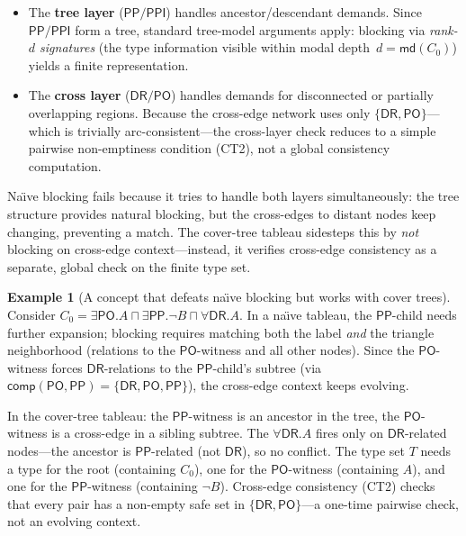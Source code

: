 \documentclass[
]{ceurart}
\theoremstyle{definition}
\newtheorem{examplex}[theorem]{Example}
\newcommand{\DR}{\ensuremath{\mathsf{DR}}}
\newcommand{\PO}{\ensuremath{\mathsf{PO}}}
\newcommand{\PP}{\ensuremath{\mathsf{PP}}}
\newcommand{\PPI}{\ensuremath{\mathsf{PPI}}}
\newcommand{\comp}{\ensuremath{\mathsf{comp}}}
\newcommand{\md}{\ensuremath{\mathsf{md}}}
\begin{document}
\begin{itemize}
  \item The \textbf{tree layer} ($\PP/\PPI$) handles
    ancestor/descendant demands.  Since $\PP/\PPI$ form a tree,
    standard tree-model arguments apply: blocking via
    \emph{rank-$d$ signatures} (the type information visible
    within modal depth~$d = \md(C_0)$) yields a finite
    representation.

  \item The \textbf{cross layer} ($\DR/\PO$) handles demands for
    disconnected or partially overlapping regions.  Because the
    cross-edge network uses only $\{\DR,\PO\}$---which is
    trivially arc-consistent---the cross-layer check reduces to a
    simple pairwise non-emptiness condition (CT2), not a global
    consistency computation.
\end{itemize}

Na\"{\i}ve blocking fails because it tries to handle both layers
simultaneously: the tree structure provides natural blocking, but
the cross-edges to distant nodes keep changing, preventing a match.
The cover-tree tableau sidesteps this by \emph{not} blocking on
cross-edge context---instead, it verifies cross-edge consistency
as a separate, global check on the finite type set.

\begin{examplex}[A concept that defeats na\"{\i}ve blocking but
  works with cover trees]
\label{ex:cover-tree-win}
Consider $C_0 = \exists\PO.A \sqcap \exists\PP.\neg B \sqcap
\forall\DR.A$.
In a na\"{\i}ve tableau, the $\PP$-child needs further expansion;
blocking requires matching both the label \emph{and} the
triangle neighborhood (relations to the $\PO$-witness and all
other nodes).  Since the $\PO$-witness forces $\DR$-relations
to the $\PP$-child's subtree (via $\comp(\PO, \PP) = \{\DR,\PO,\PP\}$),
the cross-edge context keeps evolving.

In the cover-tree tableau: the $\PP$-witness is an ancestor in
the tree, the $\PO$-witness is a cross-edge in a sibling subtree.
The $\forall\DR.A$ fires only on $\DR$-related nodes---the
ancestor is $\PP$-related (not $\DR$), so no conflict.
The type set $T$ needs a type for the root (containing $C_0$),
one for the $\PO$-witness (containing $A$), and one for the
$\PP$-witness (containing $\neg B$).  Cross-edge consistency
(CT2) checks that every pair has a non-empty safe set in
$\{\DR,\PO\}$---a one-time pairwise check, not an evolving
context.
\end{examplex}
\end{document}

